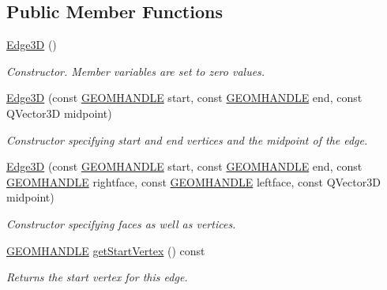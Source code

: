 \subsection*{Public Member Functions}
\begin{DoxyCompactItemize}
\item 
\hypertarget{class_edge3_d_a6f25535dfee47bf06832243b11207ba6}{\hyperlink{class_edge3_d_a6f25535dfee47bf06832243b11207ba6}{Edge3\-D} ()}\label{class_edge3_d_a6f25535dfee47bf06832243b11207ba6}

\begin{DoxyCompactList}\small\item\em Constructor. Member variables are set to zero values. \end{DoxyCompactList}\item 
\hyperlink{class_edge3_d_a2c4d543fd8a4ffe272539547800c712c}{Edge3\-D} (const \hyperlink{vertex_8h_a72202e57358ed73cd212e9a2eaf39aeb}{G\-E\-O\-M\-H\-A\-N\-D\-L\-E} start, const \hyperlink{vertex_8h_a72202e57358ed73cd212e9a2eaf39aeb}{G\-E\-O\-M\-H\-A\-N\-D\-L\-E} end, const Q\-Vector3\-D midpoint)
\begin{DoxyCompactList}\small\item\em Constructor specifying start and end vertices and the midpoint of the edge. \end{DoxyCompactList}\item 
\hyperlink{class_edge3_d_af04a433a585de58702f3586d8a52219d}{Edge3\-D} (const \hyperlink{vertex_8h_a72202e57358ed73cd212e9a2eaf39aeb}{G\-E\-O\-M\-H\-A\-N\-D\-L\-E} start, const \hyperlink{vertex_8h_a72202e57358ed73cd212e9a2eaf39aeb}{G\-E\-O\-M\-H\-A\-N\-D\-L\-E} end, const \hyperlink{vertex_8h_a72202e57358ed73cd212e9a2eaf39aeb}{G\-E\-O\-M\-H\-A\-N\-D\-L\-E} rightface, const \hyperlink{vertex_8h_a72202e57358ed73cd212e9a2eaf39aeb}{G\-E\-O\-M\-H\-A\-N\-D\-L\-E} leftface, const Q\-Vector3\-D midpoint)
\begin{DoxyCompactList}\small\item\em Constructor specifying faces as well as vertices. \end{DoxyCompactList}\item 
\hyperlink{vertex_8h_a72202e57358ed73cd212e9a2eaf39aeb}{G\-E\-O\-M\-H\-A\-N\-D\-L\-E} \hyperlink{class_edge3_d_a061cf7a8c3324e564d42283702454e69}{get\-Start\-Vertex} () const 
\begin{DoxyCompactList}\small\item\em Returns the start vertex for this edge. \end{DoxyCompactList}\item 

\end{DoxyCompactItemize}
